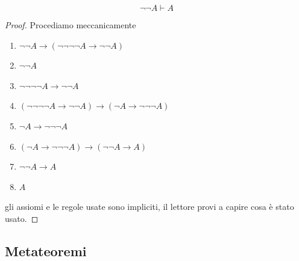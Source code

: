 \documentclass[11pt]{scrartcl}
\begin{document}
	\begin{theorem}
		$$\lnot \lnot A \vdash A$$
	\end{theorem}
	\begin{proof}
		Procediamo meccanicamente
		\begin{enumerate}
			\item $\lnot\lnot A \to (\lnot \lnot \lnot \lnot A \to \lnot \lnot A)$
			\item $\lnot \lnot A$
			\item $\lnot \lnot \lnot \lnot A \to \lnot \lnot A$
			\item $(\lnot \lnot \lnot \lnot A \to \lnot \lnot A) \to ( \lnot A \to \lnot \lnot \lnot A)$
			\item $\lnot A \to \lnot \lnot \lnot A$
			\item $ (\lnot A \to \lnot \lnot \lnot A) \to (\lnot \lnot A \to A) $
			\item $\lnot \lnot A \to A$
			\item $A$
		\end{enumerate}
		gli assiomi e le regole usate sono impliciti, il lettore provi a capire cosa è stato usato.
	\end{proof}
	
	\subsection{Metateoremi}
	
\end{document}
